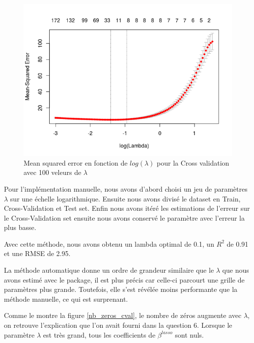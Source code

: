\documentclass{article}
\begin{document}
	\begin{figure}[ht]
		\centering
		\caption{\label{cv_plot} Mean squared error en fonction de $log(\lambda)$ pour la Cross validation avec 100 veleurs de $\lambda$}
		\includegraphics[scale=0.7]{CV_plot.png}
	\end{figure}
	
	Pour l'implémentation manuelle, nous avons d'abord choisi un jeu de paramètres $\lambda$ sur une échelle logarithmique. Ensuite nous avons divisé le dataset en Train, Cross-Validation et Test set. Enfin nous avons itéré les estimations de l'erreur sur le Cross-Validation set ensuite nous avons conservé le paramètre avec l'erreur la plus basse.
	
	Avec cette méthode, nous avons obtenu un lambda optimal de 0.1, un $R^{2}$ de 0.91 et une RMSE de 2.95.
	
	La méthode automatique donne un ordre de grandeur similaire que le $\lambda$ que nous avons estimé avec le package, il est plus précis car celle-ci parcourt une grille de paramètres plus grande. Toutefois, elle s'est révélée moins performante que la méthode manuelle, ce qui est surprenant. 

	Comme le montre la figure \ref{nb_zeros_cval}, le nombre de zéros augmente avec $\lambda$, on retrouve l'explication que l'on avait fourni dans la question 6. Lorsque le paramètre $\lambda$ est très grand, tous les coefficients de $\beta^{lasso}$ sont nuls.
	
\end{document}
